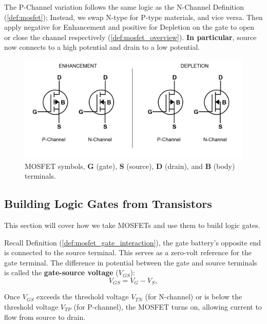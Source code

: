 \vspace{-1em}
\begin{Def}

    \label{def:mosfet_p_channel}

    The P-Channel variation follows the same logic as the N-Channel Definition (\ref{def:mosfet});
    Instead, we swap N-type for P-type materials, and vice versa. Then apply negative for Enhancement
    and positive for Depletion on the gate to open or close the channel respectively (\ref{def:mosfet_overview}).
    \textbf{In particular}, source now connects to a high potential and drain to a low potential.

\end{Def}

\vspace{-1em}
\begin{figure}[ht!]
  \centering
    \includegraphics[width=.9\textwidth]{Sections/circuits/mosfet-symbol.png}
  \caption{MOSFET symbols, \textbf{G} (gate), \textbf{S} (source), \textbf{D} (drain), and \textbf{B} (body) terminals.}
  \label{fig:mosfet-symbol}
\end{figure}

\newpage 

\subsection{Building Logic Gates from Transistors}

\noindent
This section will cover how we take MOSFETs and use them to build logic gates.

\begin{Def}

  \label{def:gate_source_voltage}

  Recall Definition (\ref{def:mosfet_gate_interaction}), the gate battery's opposite end is connected to the source terminal.
  This serves as a zero-volt reference for the gate terminal.
  The difference in potential between the gate and source terminals is called the \textbf{gate-source voltage} ($V_{GS}$):
  \[
    V_{GS} = V_{G} - V_{S},
  \]
  
  \noindent
  Once $V_{GS}$ exceeds the threshold voltage $V_{TN}$ (for N-channel) or is below the threshold voltage $V_{TP}$ (for P-channel), the MOSFET turns on, allowing current to flow from source to drain.
\end{Def}

